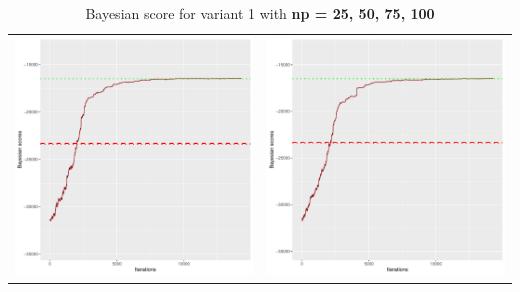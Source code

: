 \documentclass[]{scrartcl}
\begin{document}
\begin{table}[h!]
\begin{tabular}{cc}
\includegraphics[scale = 0.4]{./figs/win95pts/v1/75/bayBoundsEvolution-14252.pdf} & 
\includegraphics[scale = 0.4]{./figs/win95pts/v1/100/bayBoundsEvolution-14252.pdf} \\
\end{tabular}
\caption{Bayesian score for variant 1 with \textbf{np =  25, 50, 75, 100}}
\end{table}
\end{document}
